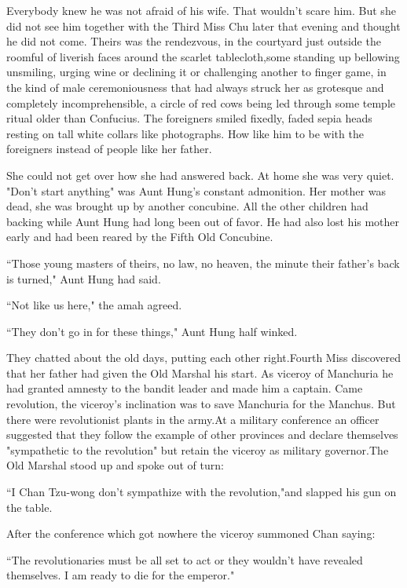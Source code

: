 \par Everybody knew he was not afraid of his wife. That wouldn't scare him. But she did not see him together with the Third Miss Chu later that evening and thought he did not come. Theirs was the rendezvous, in the courtyard just outside the roomful of liverish faces around the scarlet tablecloth,some standing up bellowing unsmiling, urging wine or declining it or challenging another to finger game, in the kind of male ceremoniousness that had always struck her as grotesque and completely incomprehensible, a circle of red cows being led through some temple ritual older than Confucius. The foreigners smiled fixedly, faded sepia heads resting on tall white collars like photographs. How like him to be with the foreigners instead of people like her father.
\par She could not get over how she had answered back. At home she was very quiet. "Don't start anything" was Aunt Hung's constant admonition. Her mother was dead, she was brought up by another concubine. All the other children had backing while Aunt Hung had long been out of favor. He had also lost his mother early and had been reared by the Fifth Old Concubine.
\par ``Those young masters of theirs, no law, no heaven, the minute their father's back is turned," Aunt Hung had said.
\par ``Not like us here," the amah agreed.
\par ``They don't go in for these things," Aunt Hung half winked.
\par They chatted about the old days, putting each other right.Fourth Miss discovered that her father had given the Old Marshal his start. As viceroy of Manchuria he had granted amnesty to the bandit leader and made him a captain. Came revolution, the viceroy's inclination was to save Manchuria for the Manchus. But there were revolutionist plants in the army.At a military conference an officer suggested that they follow the example of other provinces and declare themselves "sympathetic to the revolution" but retain the viceroy as military governor.The Old Marshal stood up and spoke out of turn:
\par ``I Chan Tzu-wong don't sympathize with the revolution,"and slapped his gun on the table.
\par After the conference which got nowhere the viceroy summoned Chan saying:
\par ``The revolutionaries must be all set to act or they wouldn't have revealed themselves. I am ready to die for the emperor."
